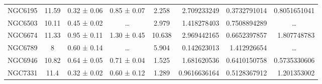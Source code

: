 \documentclass[reprint,%
 amsmath,amssymb,
 aps,
]{revtex4-1}
\begin{document}
\begin{table}[]
\begin{tabular}{cccccrrc}
\rowcolor[HTML]{F3F3F3} 
NGC6195              & 11.59                     & 0.32 ± 0.06           & 0.85 ± 0.07            & 2.258                                                        & 2.709233249                                                           & 0.3732791014                                                          & \multicolumn{1}{r}{\cellcolor[HTML]{F3F3F3}0.8051651041}      \\
\rowcolor[HTML]{F3F3F3} 
NGC6503              & 10.11                     & 0.45 ± 0.02           & …                      & 2.979                                                        & 1.418278403                                                           & 0.7508894289                                                          & …                                                             \\
\rowcolor[HTML]{F3F3F3} 
NGC6674              & 11.33                     & 0.95 ± 0.11           & 1.30 ± 0.45            & 10.638                                                       & 2.969442165                                                           & 0.6652397857                                                          & \multicolumn{1}{r}{\cellcolor[HTML]{F3F3F3}1.807748783}       \\
\rowcolor[HTML]{F3F3F3} 
NGC6789              & 8                         & 0.60 ± 0.14           & …                      & 5.904                                                        & 0.142623013                                                           & 1.412926654                                                           & …                                                             \\
\rowcolor[HTML]{F3F3F3} 
NGC6946              & 10.82                     & 0.64 ± 0.05           & 0.71 ± 0.04            & 1.525                                                        & 1.681620536                                                           & 0.6410150758                                                          & \multicolumn{1}{r}{\cellcolor[HTML]{F3F3F3}0.5735330606}      \\
\rowcolor[HTML]{F3F3F3} 
NGC7331              & 11.4                      & 0.32 ± 0.02           & 0.60 ± 0.12            & 1.289                                                        & 0.9616636164                                                          & 0.5128367912                                                          & \multicolumn{1}{r}{\cellcolor[HTML]{F3F3F3}1.201353002}       \\

\end{tabular}
\end{table}
\end{document}
